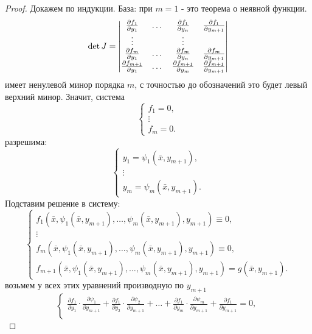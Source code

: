 \begin{proof}
    Докажем по индукции. База: при $m=1$ - это теорема о неявной функции.
    \[
        \det{J}=\begin{vmatrix}
            \frac{\partial {f_1}}{\partial {y_1}} & \dots & \frac{\partial {f_1}}{\partial {y_n}} & \frac{\partial {f_1}}{\partial {y_{m+1}}}\\
            \vdots & \null & \vdots\\
            \frac{\partial {f_m}}{\partial {y_1}} & \dots & \frac{\partial {f_m}}{\partial {y_n}} & \frac{\partial {f_m}}{\partial {y_{m+1}}}\\
            \frac{\partial {f_{m+1}}}{\partial {y_1}} & \dots & \frac{\partial {f_{m+1}}}{\partial {y_m}} & \frac{\partial {f_{m+1}}}{\partial {y_{m+1}}}
        \end{vmatrix}
    \]
    имеет ненулевой минор порядка $m$, с точностью до обозначений это будет левый верхний минор. Значит, система
    \[\begin{cases}
        f_1 = 0,\\
        \vdots\\
        f_m=0.
    \end{cases}
    \]
    разрешима:
    \[\begin{cases}
        y_1=\psi_1(\bar{x},y_{m+1}),\\
        \vdots\\
        y_m=\psi_m(\bar{x}, y_{m+1}).
    \end{cases}
    \]
    Подставим решение в систему:
    \[\begin{cases}
        f_1(\bar{x}, \psi_1(\bar{x}, y_{m+1}), \dots, \psi_m(\bar{x}, y_{m+1}), y_{m+1})\equiv 0,\\
        \vdots\\
        f_m(\bar{x}, \psi_1(\bar{x}, y_{m+1}), \dots, \psi_m(\bar{x}, y_{m+1}), y_{m+1})\equiv 0,\\
        f_{m+1}(\bar{x}, \psi_1(\bar{x}, y_{m+1}),\dots,\psi_m(\bar{x}, y_{m+1}), y_{m+1})=g(\bar{x}, y_{m+1}).
    \end{cases}
    \]
    возьмем у всех этих уравнений производную по $y_{m+1}$
    \[\begin{cases}
        \frac{\partial {f_1}}{\partial {y_1}}\cdot \frac{\partial {\psi_1}}{\partial {y_{m+1}}}+\frac{\partial {f_1}}{\partial {y_2}}\cdot \frac{\partial {\psi_2}}{\partial {y_{m+1}}}+ \dots +\frac{\partial {f_1}}{\partial {y_m}}\cdot \frac{\partial {\psi_m}}{\partial {y_{m+1}}}+\frac{\partial {f_1}}{\partial {y_{m+1}}}=0,\\

\end{cases}\]
\end{proof}
